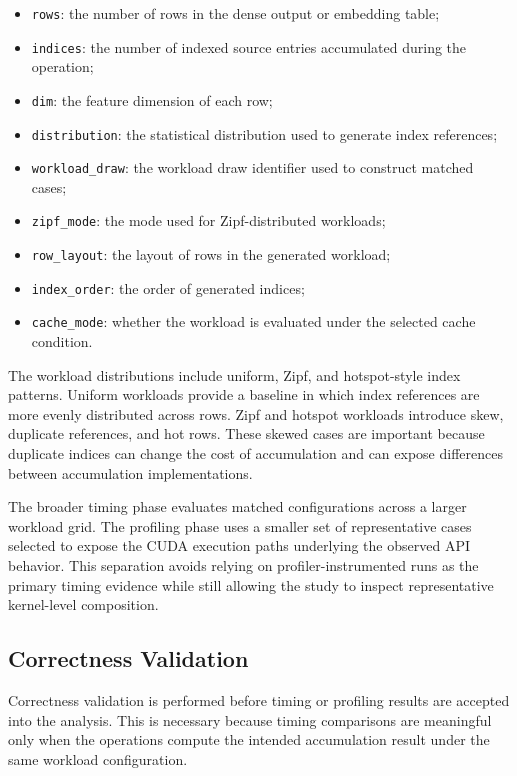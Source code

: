 \begin{itemize}[leftmargin=*]
    \item \texttt{rows}: the number of rows in the dense output or embedding table;
    \item \texttt{indices}: the number of indexed source entries accumulated during the operation;
    \item \texttt{dim}: the feature dimension of each row;
    \item \texttt{distribution}: the statistical distribution used to generate index references;
    \item \texttt{workload\_\allowbreak draw}: the workload draw identifier used to construct matched cases;
    \item \texttt{zipf\_\allowbreak mode}: the mode used for Zipf-distributed workloads;
    \item \texttt{row\_\allowbreak layout}: the layout of rows in the generated workload;
    \item \texttt{index\_\allowbreak order}: the order of generated indices;
    \item \texttt{cache\_\allowbreak mode}: whether the workload is evaluated under the selected cache condition.
\end{itemize}

The workload distributions include uniform, Zipf, and hotspot-style index patterns. Uniform workloads provide a baseline in which index references are more evenly distributed across rows. Zipf and hotspot workloads introduce skew, duplicate references, and hot rows. These skewed cases are important because duplicate indices can change the cost of accumulation and can expose differences between accumulation implementations.

The broader timing phase evaluates matched configurations across a larger workload grid. The profiling phase uses a smaller set of representative cases selected to expose the CUDA execution paths underlying the observed API behavior. This separation avoids relying on profiler-instrumented runs as the primary timing evidence while still allowing the study to inspect representative kernel-level composition.

\subsection{Correctness Validation}

Correctness validation is performed before timing or profiling results are accepted into the analysis. This is necessary because timing comparisons are meaningful only when the operations compute the intended accumulation result under the same workload configuration.

